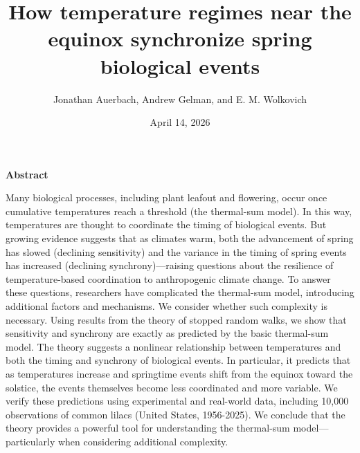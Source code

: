 \documentclass[
]{article}
\title{How temperature regimes near the equinox synchronize spring biological events}
\author{Jonathan Auerbach, Andrew Gelman, and E. M. Wolkovich}
\date{April 14, 2026}
\begin{document}
\maketitle

\vspace{2em}

\small

\begin{center}
\textbf{Abstract}
\end{center}

\vspace{1em}

\begin{center}
\begin{minipage}{0.9\linewidth} %
Many biological processes, including plant leafout and flowering, occur once cumulative temperatures reach a threshold (the thermal-sum model). In this way, temperatures are thought to coordinate the timing of biological events. But growing evidence suggests that as climates warm, both the advancement of spring has slowed (declining sensitivity) and the variance in the timing of spring events has increased (declining synchrony)---raising questions about the resilience of temperature-based coordination to anthropogenic climate change. To answer these questions, researchers have complicated the thermal-sum model, introducing additional factors and mechanisms. We consider whether such complexity is necessary. Using results from the theory of stopped random walks, we show that sensitivity and synchrony are exactly as predicted by the basic thermal-sum model. The theory suggests a nonlinear relationship between temperatures and both the timing and synchrony of biological events. In particular, it predicts that as temperatures increase and springtime events shift from the equinox toward the solstice, %
the events themselves become less coordinated and more variable. We verify these predictions using experimental and real-world data, including 10,000 observations of common lilacs (United States, 1956-2025). We conclude that the theory provides a powerful tool for understanding the thermal-sum model---particularly when considering additional complexity.
\end{minipage}
\end{center}

\normalsize

\vspace{2em}
\end{document}
